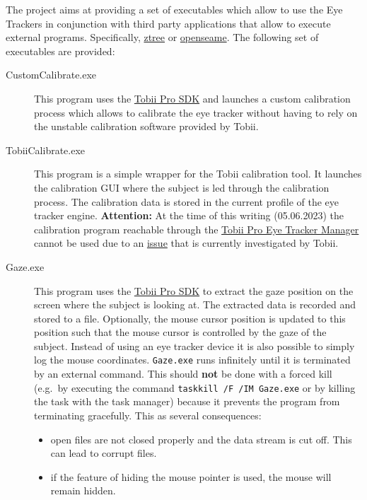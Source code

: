 \documentclass[a4paper,oneside]{book}
\begin{document}
The project aims at providing a set of executables which allow to use the Eye Trackers in conjunction with third party applications that allow to execute external programs.
Specifically, \href{http://www.ztree.uzh.ch/en.html}{ztree} or \href{https://osdoc.cogsci.nl/3.3/}{openseame}.
The following set of executables are provided:
\begin{description}
    \item[CustomCalibrate.exe] This program uses the \href{http://developer.tobii.com/tobii-pro-sdk/}{Tobii Pro SDK} and launches a custom calibration process which allows to calibrate the eye tracker without having to rely on the unstable calibration software provided by Tobii.
    \item[TobiiCalibrate.exe] This program is a simple wrapper for the Tobii calibration tool.
        It launches the calibration GUI where the subject is led through the calibration process.
        The calibration data is stored in the current profile of the eye tracker engine.
        \textbf{Attention:} At the time of this writing (05.06.2023) the calibration program reachable through the \href{https://www.tobii.com/products/software/applications-and-developer-kits/tobii-pro-eye-tracker-manager}{Tobii Pro Eye Tracker Manager} cannot be used due to an \href{https://connect.tobii.com/s/case/5004v000020xgMFAAY/tobii-pro-eye-tracker-manager-integration-problems}{issue} that is currently investigated by Tobii.
    \item[Gaze.exe] This program uses the \href{http://developer.tobii.com/tobii-pro-sdk/}{Tobii Pro SDK} to extract the gaze position on the screen where the subject is looking at.
        The extracted data is recorded and stored to a file.
        Optionally, the mouse cursor position is updated to this position such that the mouse cursor is controlled by the gaze of the subject.
        Instead of using an eye tracker device it is also possible to simply log the mouse coordinates.
        \texttt{Gaze.exe} runs infinitely until it is terminated by an external command.
        This should \textbf{not} be done with a forced kill (e.g.~by executing the command \texttt{taskkill /F /IM Gaze.exe} or by killing the task with the task manager) because it prevents the program from terminating gracefully.
        This as several consequences:
        \begin{itemize}
            \item open files are not closed properly and the data stream is cut off. This can lead to corrupt files.
            \item if the feature of hiding the mouse pointer is used, the mouse will remain hidden.

\end{itemize}
\end{description}
\end{document}

